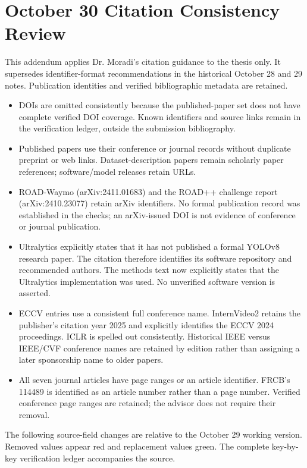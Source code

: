 \chapter*{October 30 Citation Consistency Review}
This addendum applies Dr. Moradi's citation guidance to the thesis only. It supersedes identifier-format recommendations in the historical October 28 and 29 notes. Publication identities and verified bibliographic metadata are retained.
\begin{itemize}
\item DOIs are omitted consistently because the published-paper set does not have complete verified DOI coverage. Known identifiers and source links remain in the verification ledger, outside the submission bibliography.
\item Published papers use their conference or journal records without duplicate preprint or web links. Dataset-description papers remain scholarly paper references; software/model releases retain URLs.
\item ROAD-Waymo (arXiv:2411.01683) and the ROAD++ challenge report (arXiv:2410.23077) retain arXiv identifiers. No formal publication record was established in the checks; an arXiv-issued DOI is not evidence of conference or journal publication.
\item Ultralytics explicitly states that it has not published a formal YOLOv8 research paper. The citation therefore identifies its software repository and recommended authors. The methods text now explicitly states that the Ultralytics implementation was used. No unverified software version is asserted.
\item ECCV entries use a consistent full conference name. InternVideo2 retains the publisher's citation year 2025 and explicitly identifies the ECCV 2024 proceedings. ICLR is spelled out consistently. Historical IEEE versus IEEE/CVF conference names are retained by edition rather than assigning a later sponsorship name to older papers.
\item All seven journal articles have page ranges or an article identifier. FRCB's 114489 is identified as an article number rather than a page number. Verified conference page ranges are retained; the advisor does not require their removal.
\end{itemize}
The following source-field changes are relative to the October 29 working version. Removed values appear red and replacement values green. The complete key-by-key verification ledger accompanies the source.

